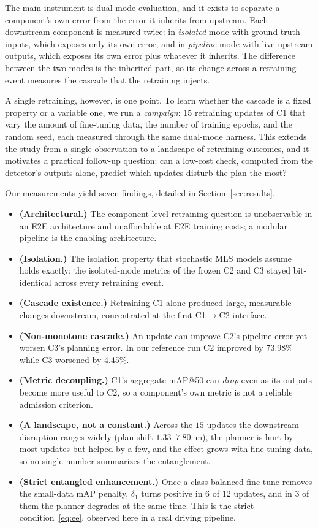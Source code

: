 \documentclass[conference]{IEEEtran}
\begin{document}
The main instrument is dual-mode evaluation, and it exists to separate a
component's own error from the error it inherits from upstream. Each downstream
component is measured twice: in \emph{isolated} mode with ground-truth inputs,
which exposes only its own error, and in \emph{pipeline} mode with live upstream
outputs, which exposes its own error plus whatever it inherits. The difference
between the two modes is the inherited part, so its change across a retraining
event measures the cascade that the retraining injects.

A single retraining, however, is one point. To learn whether the cascade is a
fixed property or a variable one, we run a \emph{campaign}: $15$ retraining
updates of C1 that vary the amount of fine-tuning data, the number of training
epochs, and the random seed, each measured through the same dual-mode harness.
This extends the study from a single observation to a landscape of retraining
outcomes, and it motivates a practical follow-up question: can a low-cost check,
computed from the detector's outputs alone, predict which updates disturb the
plan the most?

Our measurements yield seven findings, detailed in Section~\ref{sec:results}.
\begin{itemize}
\item[\textbf{F1.}] \textbf{(Architectural.)} The component-level retraining
question is unobservable in an E2E architecture and unaffordable at E2E training
costs; a modular pipeline is the enabling architecture.
\item[\textbf{F2.}] \textbf{(Isolation.)} The isolation property that stochastic
MLS models assume holds exactly: the isolated-mode metrics of the frozen C2 and
C3 stayed bit-identical across every retraining event.
\item[\textbf{F3.}] \textbf{(Cascade existence.)} Retraining C1 alone produced
large, measurable changes downstream, concentrated at the first C1$\to$C2
interface.
\item[\textbf{F4.}] \textbf{(Non-monotone cascade.)} An update can improve C2's
pipeline error yet worsen C3's planning error. In our reference run C2 improved
by 73.98\% while C3 worsened by 4.45\%.
\item[\textbf{F5.}] \textbf{(Metric decoupling.)} C1's aggregate mAP@50 can
\emph{drop} even as its outputs become more useful to C2, so a component's own
metric is not a reliable admission criterion.
\item[\textbf{F6.}] \textbf{(A landscape, not a constant.)} Across the $15$
updates the downstream disruption ranges widely (plan shift $1.33$--$7.80$~m),
the planner is hurt by most updates but helped by a few, and the effect grows
with fine-tuning data, so no single number summarizes the entanglement.
\item[\textbf{F7.}] \textbf{(Strict entangled enhancement.)} Once a
class-balanced fine-tune removes the small-data mAP penalty, $\delta_1$ turns
positive in $6$ of $12$ updates, and in $3$ of them the planner degrades at the
same time. This is the strict condition~\eqref{eq:ee}, observed here in a real
driving pipeline.
\end{itemize}
\end{document}
